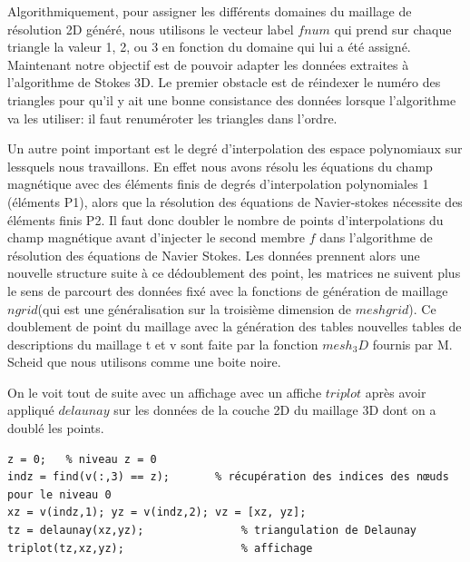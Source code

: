 \documentclass[a4paper,12pt,titlepage]{report}
\begin{document}
\begin{onehalfspace}
\newpage
Algorithmiquement, pour assigner les différents domaines du maillage de résolution 2D généré, nous utilisons le vecteur label $fnum$ qui prend sur chaque triangle la valeur 1, 2, ou 3 en fonction du domaine qui lui a été assigné.
\newline
Maintenant  notre objectif est de pouvoir adapter les données extraites à l'algorithme de Stokes 3D. Le premier obstacle est de réindexer le numéro des triangles pour qu'il y ait une bonne consistance des données lorsque l'algorithme va les utiliser: il faut renuméroter les triangles dans l'ordre. 
\newline  	

Un autre point important est le degré d'interpolation des espace polynomiaux sur lessquels nous travaillons. En effet nous avons résolu les équations du champ magnétique avec des éléments finis de degrés d'interpolation polynomiales 1 (éléments P1), alors que la résolution des équations de Navier-stokes nécessite des éléments finis P2. Il faut donc doubler le nombre de points d'interpolations du champ magnétique avant d'injecter le second membre $f$ dans l'algorithme de résolution des équations de Navier Stokes. Les données prennent alors une nouvelle structure suite à ce dédoublement des point, les matrices ne suivent plus le sens de parcourt des données fixé avec la fonctions de génération de maillage $ngrid$(qui est une généralisation sur la troisième dimension  de $meshgrid$). Ce doublement de point du maillage avec la génération des tables nouvelles tables de descriptions du maillage t et v sont faite par la fonction $mesh_3D$ fournis par M. Scheid que nous utilisons comme une boite noire.

On le voit tout de suite avec un affichage avec un affiche $triplot$ après avoir appliqué $delaunay$ sur les données de la couche 2D du maillage 3D dont on a doublé les points.
\begin{verbatim}
z = 0;   % niveau z = 0
indz = find(v(:,3) == z);		% récupération des indices des nœuds pour le niveau 0
xz = v(indz,1); yz = v(indz,2); vz = [xz, yz];
tz = delaunay(xz,yz);               % triangulation de Delaunay 
triplot(tz,xz,yz);   				% affichage
\end{verbatim}


\end{onehalfspace}
\end{document}
